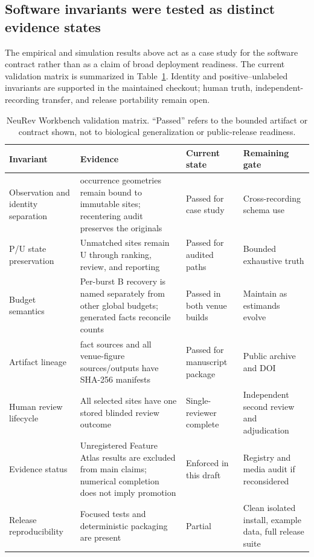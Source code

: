 \subsection{Software invariants were tested as distinct evidence states}

The empirical and simulation results above act as a case study for the software
contract rather than as a claim of broad deployment readiness. The current
validation matrix is summarized in Table~\ref{tab:software-validation}. Identity
and positive--unlabeled invariants are supported in the maintained checkout;
human truth, independent-recording transfer, and release portability remain
open.

\begin{table}[!htbp]
\centering
\caption{NeuRev Workbench validation matrix. ``Passed'' refers to the bounded
artifact or contract shown, not to biological generalization or public-release
readiness.}
\label{tab:software-validation}
\small
\begin{tabularx}{\textwidth}{>{\raggedright\arraybackslash}p{}
  >{\raggedright\arraybackslash}p{}
  >{\raggedright\arraybackslash}p{}
  >{\raggedright\arraybackslash}X}
\toprule
Invariant & Evidence & Current state & Remaining gate \\
\midrule
Observation and identity separation & \VenueCohortOccurrences{} occurrence
geometries remain bound to \VenueCohortSites{} immutable sites; recentering
audit preserves the originals & Passed for case study & Cross-recording schema
use \\
P/U state preservation & Unmatched sites remain U through ranking, review, and
reporting & Passed for audited paths & Bounded exhaustive truth \\
Budget semantics & Per-burst B\VenuePerLaneBudget{} recovery is named separately
from other global budgets; generated facts reconcile counts & Passed in both
venue builds & Maintain as estimands evolve \\
Artifact lineage & \VenueFactSourceCount{} fact sources and all venue-figure sources/outputs have
SHA-256 manifests & Passed for manuscript package & Public archive and DOI \\
Human review lifecycle & All \VenueReviewedCandidates{} selected sites have one
stored blinded review outcome & Single-reviewer complete & Independent second
review and adjudication \\
Evidence status & Unregistered Feature Atlas results are excluded from main
claims; numerical completion does not imply promotion & Enforced in this draft &
Registry and media audit if reconsidered \\
Release reproducibility & Focused tests and deterministic packaging are present &
Partial & Clean isolated install, example data, full release suite \\
\bottomrule
\end{tabularx}
\end{table}

